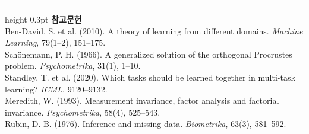 \documentclass[10pt]{article}
\begin{document}
\vspace{0.6em}
\hrule height 0.3pt
\vspace{0.5em}
{\footnotesize
\textbf{참고문헌}\\[0.3em]
Ben-David, S. et al. (2010). A theory of learning from different domains.
\emph{Machine Learning}, 79(1--2), 151--175.\\[0.15em]
Schönemann, P. H. (1966). A generalized solution of the orthogonal Procrustes
problem. \emph{Psychometrika}, 31(1), 1--10.\\[0.15em]
Standley, T. et al. (2020). Which tasks should be learned together in multi-task
learning? \emph{ICML}, 9120--9132.\\[0.15em]
Meredith, W. (1993). Measurement invariance, factor analysis and factorial
invariance. \emph{Psychometrika}, 58(4), 525--543.\\[0.15em]
Rubin, D. B. (1976). Inference and missing data. \emph{Biometrika}, 63(3), 581--592.
}
\end{document}

